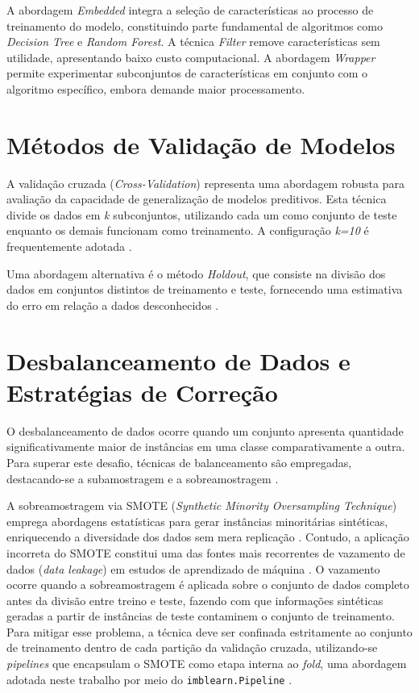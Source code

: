 A abordagem \textit{Embedded} integra a seleção de características ao processo de treinamento do modelo, constituindo parte fundamental de algoritmos como \textit{Decision Tree} e \textit{Random Forest}. A técnica \textit{Filter} remove características sem utilidade, apresentando baixo custo computacional. A abordagem \textit{Wrapper} permite experimentar subconjuntos de características em conjunto com o algoritmo específico, embora demande maior processamento.

\section{Métodos de Validação de Modelos}

A validação cruzada (\textit{Cross-Validation}) representa uma abordagem robusta para avaliação da capacidade de generalização de modelos preditivos. Esta técnica divide os dados em \textit{k} subconjuntos, utilizando cada um como conjunto de teste enquanto os demais funcionam como treinamento. A configuração \textit{k=10} é frequentemente adotada \cite{geron2019}.

Uma abordagem alternativa é o método \textit{Holdout}, que consiste na divisão dos dados em conjuntos distintos de treinamento e teste, fornecendo uma estimativa do erro em relação a dados desconhecidos \cite{geron2019}.

\section{Desbalanceamento de Dados e Estratégias de Correção}

O desbalanceamento de dados ocorre quando um conjunto apresenta quantidade significativamente maior de instâncias em uma classe comparativamente a outra. Para superar este desafio, técnicas de balanceamento são empregadas, destacando-se a subamostragem e a sobreamostragem \cite{he2009}.

A sobreamostragem via SMOTE (\textit{Synthetic Minority Oversampling Technique}) emprega abordagens estatísticas para gerar instâncias minoritárias sintéticas, enriquecendo a diversidade dos dados sem mera replicação \cite{chawla2002}. Contudo, a aplicação incorreta do SMOTE constitui uma das fontes mais recorrentes de vazamento de dados (\textit{data leakage}) em estudos de aprendizado de máquina \cite{madugula2026}. O vazamento ocorre quando a sobreamostragem é aplicada sobre o conjunto de dados completo antes da divisão entre treino e teste, fazendo com que informações sintéticas geradas a partir de instâncias de teste contaminem o conjunto de treinamento. Para mitigar esse problema, a técnica deve ser confinada estritamente ao conjunto de treinamento dentro de cada partição da validação cruzada, utilizando-se \textit{pipelines} que encapsulam o SMOTE como etapa interna ao \textit{fold}, uma abordagem adotada neste trabalho por meio do \texttt{imblearn.Pipeline} \cite{madugula2026}.

